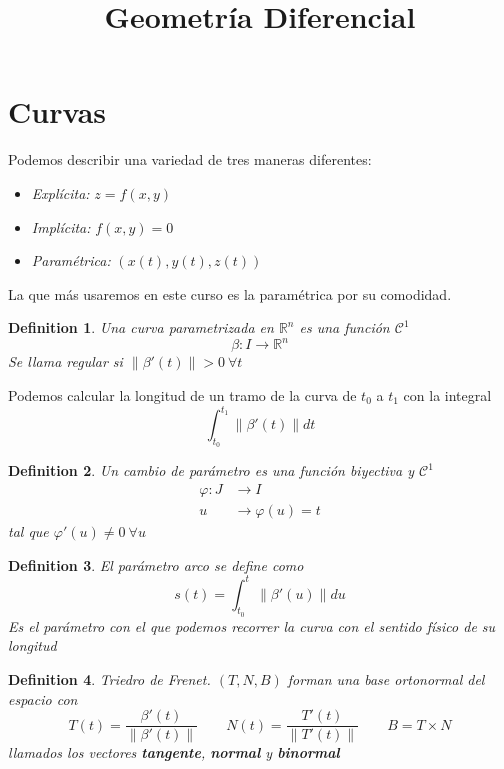 \documentclass{myclass}
\title{Geometría Diferencial}
\newtheorem*{definition}{Definition}
\begin{document}
\maketitle
\tableofcontents
\newpage

\section{Curvas}
Podemos describir una variedad de tres maneras diferentes:
\begin{itemize}
  \item \textit{Explícita:} $z = f(x, y)$
  \item \textit{Implícita:} $f(x, y)=0$
  \item \textit{Paramétrica:} $(x(t), y(t), z(t))$
\end{itemize}
La que más usaremos en este curso es la paramétrica por su comodidad.

\begin{definition}
Una curva parametrizada en $\mathbb{R}^n$ es una función $\mathcal{C}^1$ 
\[
\beta : I \to \mathbb{R}^n
\] 
Se llama regular si $\|\beta'(t)\|>0 \ \forall t$
\end{definition}

Podemos calcular la longitud de un tramo de la curva de $t_0$ a $t_1$ con la integral
\[
\int_{t_0}^{t_1}\|\beta'(t)\|dt
\] 

\begin{definition}
Un cambio de parámetro es una función biyectiva y $\mathcal{C}^1$
\begin{align*}
  \varphi : J & \to I \\
  u & \to \varphi (u) = t
\end{align*}
tal que $\varphi '(u)\neq 0 \ \forall u$

\end{definition}

\begin{definition}
El parámetro arco se define como
\[
s(t) = \int_{t_0}^{t}\|\beta '(u)\|du
\]
Es el parámetro con el que podemos recorrer la curva con el sentido físico de su longitud
\end{definition}

\begin{definition}
Triedro de Frenet. $(T, N, B)$ forman una base ortonormal del espacio con
 \[
   T(t) = \frac{\beta'(t)}{\|\beta'(t)\|} \qquad N(t) =
\frac{T'(t)}{\|T'(t)\|} \qquad
B = T\times N
\] 
llamados los vectores \textbf{tangente}, \textbf{normal} y \textbf{binormal}
\end{definition}
\end{document}
